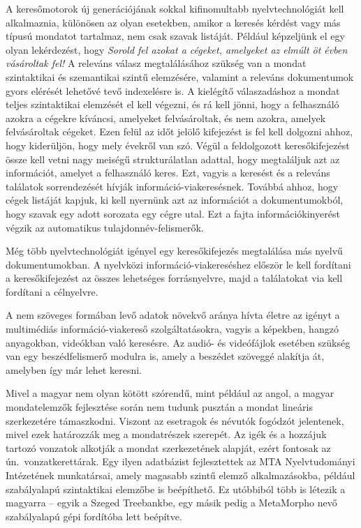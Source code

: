 \begin{multicols}{2}
A keresőmotorok új generációjának sokkal kifinomultabb nyelvtechnológiát kell al\-kal\-maz\-nia, különösen az olyan esetekben, amikor a keresés kérdést vagy más típusú mondatot tartalmaz, nem csak szavak listáját. Például képzeljünk el egy olyan lekérdezést, hogy \textit{Sorold fel azokat a cégeket, amelyeket az elmúlt öt évben vásároltak fel!} A releváns válasz megtalálásához szükség van a mondat szintaktikai és szemantikai szintű elem\-zé\-sé\-re, valamint a releváns dokumentumok gyors elérését lehetővé tevő indexelésre is. A kielégítő válaszadáshoz a mondat teljes szintaktikai elemzését el kell végezni, és rá kell jönni, hogy a felhasználó azokra a cégekre kíváncsi, amelyeket felvásároltak, és nem azokra, amelyek felvásároltak cégeket. Ezen felül az időt jelölő kifejezést is fel kell dolgozni ahhoz, hogy kiderüljön, hogy mely évekről van szó. Végül a feldolgozott keresőkifejezést össze kell vetni nagy meiségű strukturálatlan adattal, hogy megtaláljuk azt az információt, amelyet a felhasználó keres. Ezt, vagyis a keresést és a releváns találatok sorrendezését hívják információ-viakeresésnek. Továbbá ahhoz, hogy cégek listáját kapjuk, ki kell nyernünk azt az információt a dokumentumokból, hogy szavak egy adott sorozata egy cégre utal. Ezt a fajta információkinyerést végzik az automatikus tulajdonnév-felismerők.  


Még több nyelvtechnológiát igényel egy keresőkifejezés megtalálása más nyelvű dokumentumokban. A nyelvközi in\-for\-má\-ció-viakereséshez először le kell fordítani a keresőkifejezést az összes lehetséges forrásnyelvre, majd a találatokat via kell fordítani a célnyelvre. 

A nem szöveges formában levő adatok növekvő aránya hívta életre az igényt a multimédiás információ-viakereső szolgáltatásokra, vagyis a képekben, hangzó anyagokban, videókban való keresésre. Az audió- és videófájlok esetében szükség van egy beszédfelismerő modulra is, amely a beszédet szöveggé alakítja át, amelyben így már lehet keresni.

Mivel a magyar nem olyan kötött szórendű, mint például az angol, a magyar mondatelemzők fejlesztése során nem tudunk pusztán a mondat lineáris szerkezetére támaszkodni. Viszont az esetragok és névutók fogódzót jelentenek, mivel ezek határozzák meg a mondatrészek szerepét. Az igék és a hozzájuk tartozó vonzatok alkotják a mondat szerkezetének alapját, ezért fontosak az ún.\ vonzatkerettárak. Egy ilyen adatbázist fejlesztettek az MTA Nyelvtudományi Intézetének munkatársai, amely magasabb szintű elemző alkalmazásokba, például szabályalapú szintaktikai elem\-ző\-be is beépíthető. Ez utóbbiból több is létezik a magyarra -- egyik a Szeged Treebankbe, egy másik pedig a MetaMorpho nevő szabályalapú gépi fordítóba lett beépítve. 


\end{multicols}
